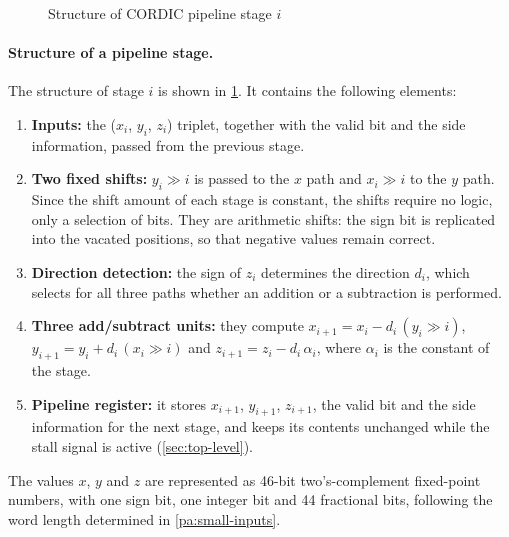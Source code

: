 \begin{figure}[H]
{%
  }
  \caption{Structure of CORDIC pipeline stage $i$}
  \label{fig:cordic-stage}
\end{figure}

\paragraph{Structure of a pipeline stage.}
The structure of stage $i$ is shown in \cref{fig:cordic-stage}. It contains
the following elements:
\begin{enumerate}
  \item \textbf{Inputs:} the ($x_{i}$, $y_{i}$, $z_{i}$) triplet, together
    with the valid bit and the side information, passed from the
    previous stage.
  \item \textbf{Two fixed shifts:} $y_{i} \gg i$ is passed to the $x$ path
    and $x_{i} \gg i$ to the $y$ path. Since the shift amount of each
    stage is constant, the shifts require no logic, only a selection of
    bits. They are arithmetic shifts: the sign bit is replicated into the
    vacated positions, so that negative values remain correct.
  \item \textbf{Direction detection:} the sign of $z_{i}$ determines the
    direction $d_{i}$, which selects for all three paths whether an
    addition or a subtraction is performed.
  \item \textbf{Three add/subtract units:} they compute
    $x_{i+1} = x_{i} - d_{i}\,(y_{i} \gg i)$,
    $y_{i+1} = y_{i} + d_{i}\,(x_{i} \gg i)$ and
    $z_{i+1} = z_{i} - d_{i}\,\alpha_{i}$, where $\alpha_{i}$ is the
    constant of the stage.
  \item \textbf{Pipeline register:} it stores $x_{i+1}$, $y_{i+1}$,
    $z_{i+1}$, the valid bit and the side information for the next
    stage, and keeps its contents unchanged while the stall signal is
    active (\cref{sec:top-level}).
\end{enumerate}
The values $x$, $y$ and $z$ are represented as 46-bit two's-complement
fixed-point numbers, with one sign bit, one integer bit and 44 fractional
bits, following the word length determined in \cref{pa:small-inputs}.

